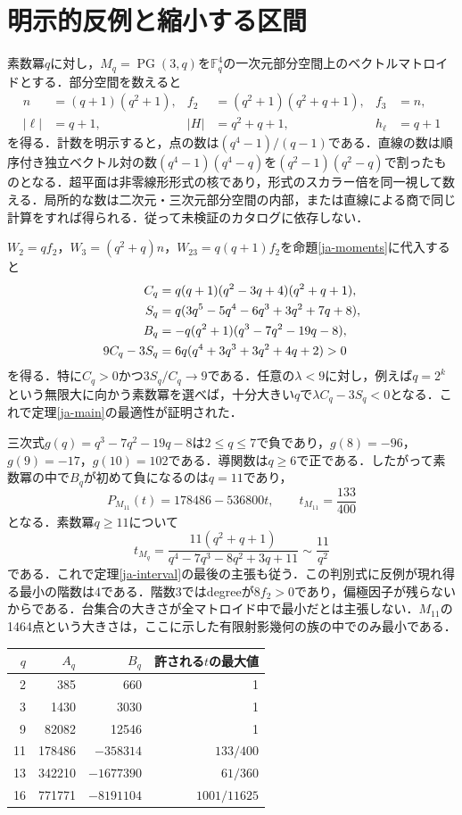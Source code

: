 \documentclass[12pt]{amsart}
\theoremstyle{definition}
\theoremstyle{remark}
\numberwithin{equation}{section}
\begin{document}
\section{明示的反例と縮小する区間}
素数冪$q$に対し，$M_q=\operatorname{PG}(3,q)$を$\mathbb F_q^4$の一次元部分空間上のベクトルマトロイドとする．部分空間を数えると
\begin{align*}
 n&=(q+1)(q^2+1),& f_2&=(q^2+1)(q^2+q+1),& f_3&=n,\\
 |\ell|&=q+1,& |H|&=q^2+q+1,& h_\ell&=q+1
\end{align*}
を得る．計数を明示すると，点の数は$(q^4-1)/(q-1)$である．直線の数は順序付き独立ベクトル対の数$(q^4-1)(q^4-q)$を$(q^2-1)(q^2-q)$で割ったものとなる．超平面は非零線形形式の核であり，形式のスカラー倍を同一視して数える．局所的な数は二次元・三次元部分空間の内部，または直線による商で同じ計算をすれば得られる．従って未検証のカタログに依存しない．

$W_2=qf_2$，$W_3=(q^2+q)n$，$W_{23}=q(q+1)f_2$を命題\ref{ja-moments}に代入すると
\begin{align}\label{ja-pg}
 C_q&=q(q+1)(q^2-3q+4)(q^2+q+1),\notag\\
 S_q&=q(3q^5-5q^4-6q^3+3q^2+7q+8),\\
 B_q&=-q(q^2+1)(q^3-7q^2-19q-8),\notag\\
 9C_q-3S_q&=6q(q^4+3q^3+3q^2+4q+2)>0\notag
\end{align}
を得る．特に$C_q>0$かつ$3S_q/C_q\to9$である．任意の$\lambda<9$に対し，例えば$q=2^k$という無限大に向かう素数冪を選べば，十分大きい$q$で$\lambda C_q-3S_q<0$となる．これで定理\ref{ja-main}の最適性が証明された．

三次式$g(q)=q^3-7q^2-19q-8$は$2\leq q\leq7$で負であり，$g(8)=-96$，$g(9)=-17$，$g(10)=102$である．導関数は$q\geq6$で正である．したがって素数冪の中で$B_q$が初めて負になるのは$q=11$であり，
\[
 P_{M_{11}}(t)=178486-536800t,\qquad t_{M_{11}}=\frac{133}{400}
\]
となる．素数冪$q\geq11$について
\begin{equation}\label{ja-tq}
 t_{M_q}=\frac{11(q^2+q+1)}{q^4-7q^3-8q^2+3q+11}
             \sim\frac{11}{q^2}
\end{equation}
である．これで定理\ref{ja-interval}の最後の主張も従う．この判別式に反例が現れ得る最小の階数は4である．階数3ではdegreeが$8f_2>0$であり，偏極因子が残らないからである．台集合の大きさが全マトロイド中で最小だとは主張しない．$M_{11}$の1464点という大きさは，ここに示した有限射影幾何の族の中でのみ最小である．

\begin{center}\small
\begin{tabular}{rrrr}
\toprule
$q$&$A_q$&$B_q$&許される$t$の最大値\\\midrule
2&385&660&1\\
3&1430&3030&1\\
9&82082&12546&1\\
11&178486&$-358314$&$133/400$\\
13&342210&$-1677390$&$61/360$\\
16&771771&$-8191104$&$1001/11625$\\\bottomrule
\end{tabular}
\end{center}
\end{document}
